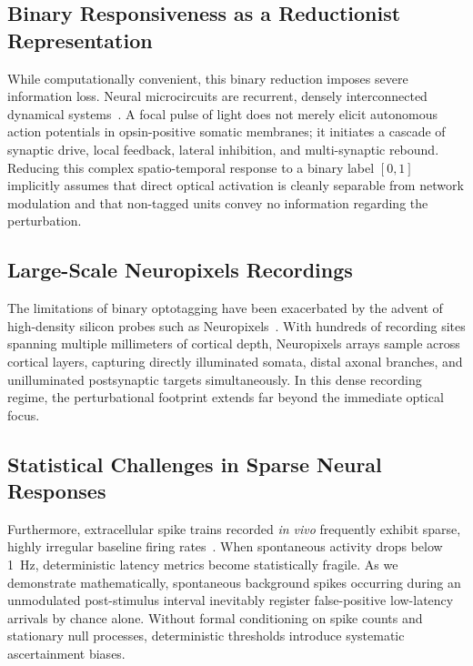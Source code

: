 \documentclass[10pt,journal,compsoc]{IEEEtran}
\begin{document}
\subsection{Binary Responsiveness as a Reductionist Representation}
While computationally convenient, this binary reduction imposes severe information loss. Neural microcircuits are recurrent, densely interconnected dynamical systems~\cite{pfeffer2013inhibition,tremblay2016gabaergic,atallah2012parvalbumin,lee2012activation,wilson2012division}. A focal pulse of light does not merely elicit autonomous action potentials in opsin-positive somatic membranes; it initiates a cascade of synaptic drive, local feedback, lateral inhibition, and multi-synaptic rebound. Reducing this complex spatio-temporal response to a binary label $[0, 1]$ implicitly assumes that direct optical activation is cleanly separable from network modulation and that non-tagged units convey no information regarding the perturbation.

\subsection{Large-Scale Neuropixels Recordings}
The limitations of binary optotagging have been exacerbated by the advent of high-density silicon probes such as Neuropixels~\cite{jun2017fully,steinmetz2019distributed,steinmetz2021neuropixels}. With hundreds of recording sites spanning multiple millimeters of cortical depth, Neuropixels arrays sample across cortical layers, capturing directly illuminated somata, distal axonal branches, and unilluminated postsynaptic targets simultaneously. In this dense recording regime, the perturbational footprint extends far beyond the immediate optical focus.

\subsection{Statistical Challenges in Sparse Neural Responses}
Furthermore, extracellular spike trains recorded \textit{in vivo} frequently exhibit sparse, highly irregular baseline firing rates~\cite{kass2014analysis,brown2004multiple,truccolo2005point}. When spontaneous activity drops below 1~Hz, deterministic latency metrics become statistically fragile. As we demonstrate mathematically, spontaneous background spikes occurring during an unmodulated post-stimulus interval inevitably register false-positive low-latency arrivals by chance alone. Without formal conditioning on spike counts and stationary null processes, deterministic thresholds introduce systematic ascertainment biases.
\end{document}
